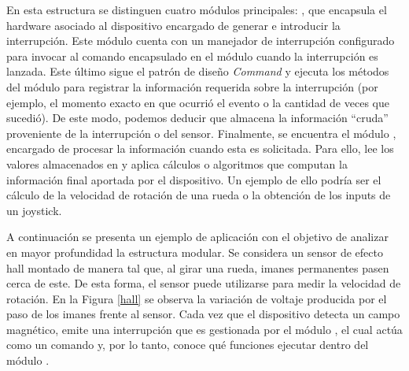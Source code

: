 \begin{figure}[H]
{
}
\label{fig:ConnectBufferToMCU}
\end{figure}


En esta estructura se distinguen cuatro módulos principales: \Dispositivo, que encapsula el hardware asociado al dispositivo encargado de generar e introducir la interrupción. Este módulo cuenta con un manejador de interrupción configurado para invocar al comando encapsulado en el módulo \Comando cuando la interrupción es lanzada. Este último sigue el patrón de diseño \textit{Command} y ejecuta los métodos del módulo \Colector para registrar la información requerida sobre la interrupción (por ejemplo, el momento exacto en que ocurrió el evento o la cantidad de veces que sucedió). De este modo, podemos deducir que \Colector almacena la información ``cruda'' proveniente de la interrupción o del sensor. Finalmente, se encuentra el módulo \Computador, encargado de procesar la información cuando esta es solicitada. Para ello, lee los valores almacenados en \Colector y aplica cálculos o algoritmos que computan la información final aportada por el dispositivo. Un ejemplo de ello podría ser el cálculo de la velocidad de rotación de una rueda o la obtención de los inputs de un joystick.

A continuación se presenta un ejemplo de aplicación con el objetivo de analizar en mayor profundidad la estructura modular. Se considera un sensor de efecto \gls{hall} montado de manera tal que, al girar una rueda, imanes permanentes pasen cerca de este. De esta forma, el sensor puede utilizarse para medir la velocidad de rotación. En la Figura \ref{hall} se observa la variación de voltaje producida por el paso de los imanes frente al sensor. Cada vez que el dispositivo detecta un campo magnético, emite una interrupción que es gestionada por el módulo \Comando, el cual actúa como un comando y, por lo tanto, conoce qué funciones ejecutar dentro del módulo \Colector.


